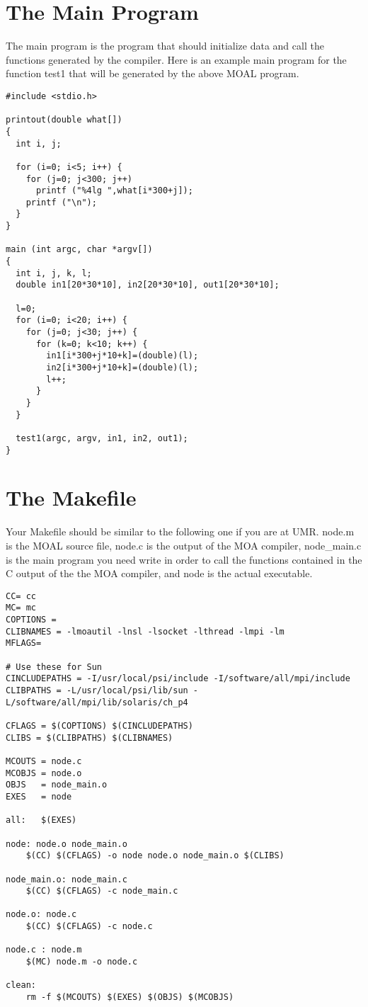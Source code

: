 \section{The Main Program}
The main program is the program that should initialize data and call the
functions generated by the compiler.  Here is an example main program for
the function test1 that will be generated by the above MOAL program.
{\samepage
\begin{verbatim}
#include <stdio.h>

printout(double what[])
{
  int i, j;

  for (i=0; i<5; i++) {
    for (j=0; j<300; j++) 
      printf ("%4lg ",what[i*300+j]);
    printf ("\n");
  }
}

main (int argc, char *argv[])
{
  int i, j, k, l;
  double in1[20*30*10], in2[20*30*10], out1[20*30*10];

  l=0;
  for (i=0; i<20; i++) {
    for (j=0; j<30; j++) {
      for (k=0; k<10; k++) {
        in1[i*300+j*10+k]=(double)(l);
        in2[i*300+j*10+k]=(double)(l);
        l++;
      }
    }
  }

  test1(argc, argv, in1, in2, out1);
}
\end{verbatim}
}
\section{The Makefile}
Your Makefile should be similar to the following one if you are at UMR.
node.m is the MOAL
source file, node.c is the output of the MOA compiler, node\_main.c is
the main program you need write in order to call the functions contained in
the C output of the the MOA compiler, and node is the actual executable.  
{\samepage
\begin{verbatim}
CC= cc
MC= mc
COPTIONS = 
CLIBNAMES = -lmoautil -lnsl -lsocket -lthread -lmpi -lm
MFLAGS=

# Use these for Sun
CINCLUDEPATHS = -I/usr/local/psi/include -I/software/all/mpi/include
CLIBPATHS = -L/usr/local/psi/lib/sun -L/software/all/mpi/lib/solaris/ch_p4

CFLAGS = $(COPTIONS) $(CINCLUDEPATHS)
CLIBS = $(CLIBPATHS) $(CLIBNAMES)

MCOUTS = node.c 
MCOBJS = node.o 
OBJS   = node_main.o 
EXES   = node

all:   $(EXES)

node: node.o node_main.o
	$(CC) $(CFLAGS) -o node node.o node_main.o $(CLIBS)

node_main.o: node_main.c
	$(CC) $(CFLAGS) -c node_main.c

node.o: node.c
	$(CC) $(CFLAGS) -c node.c

node.c : node.m
	$(MC) node.m -o node.c

clean:
	rm -f $(MCOUTS) $(EXES) $(OBJS) $(MCOBJS)
\end{verbatim}
}

